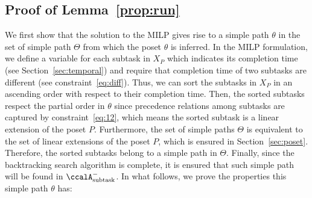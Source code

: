 \documentclass[Afour,sageh,times]{sagej}
\newcommand{\auto}[1]{\ccalA_{\textup{#1}}}
\begin{document}
{{%

\subsection{Proof of Lemma~\ref{prop:run}}\label{app:run}
We first show that the solution to the MILP gives rise to a simple path $\theta$ in the set of simple path $\Theta$ from which the poset $\theta$ is inferred. In the MILP formulation, we define a variable for each subtask in $X_P$ which indicates its completion time (see Section~\ref{sec:temporal}) and require that completion time of two subtasks are different (see constraint~\eqref{eq:diff}).  Thus, we can sort the subtasks in $X_P$  in an ascending order with respect to their completion time. Then, the sorted subtasks respect the partial order in $\theta$ since precedence relations among subtasks are captured by constraint~\eqref{eq:12}, which means the sorted subtask is a linear extension of the poset $P$. Furthermore, the set of simple paths $\Theta$ is equivalent to the set of  linear extensions of the poset $P$, which is ensured in Section~\ref{sec:poset}. Therefore, the sorted subtasks belong to a simple path in $\Theta$. Finally, since the  backtracking search algorithm is complete, it is ensured that such simple path will be found in $\auto{subtask}^-$. In what follows, we prove the properties this simple path $\theta$ has:

}}
\end{document}
